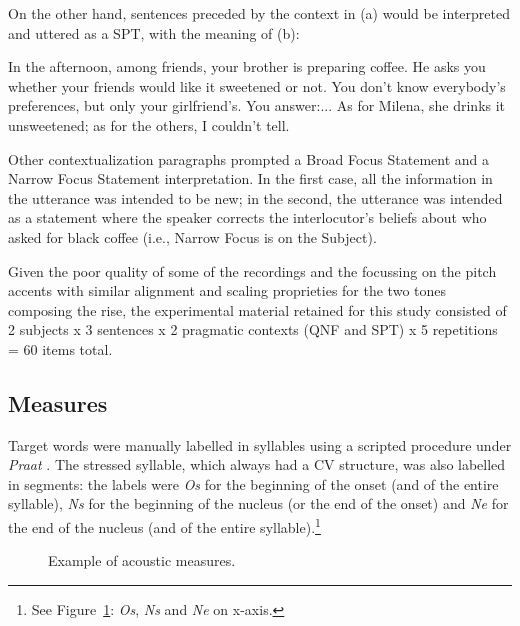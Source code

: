 On the other hand, sentences preceded by the context in (a) would be interpreted and uttered as a SPT, with the meaning of (b):

\eal
\ex In the afternoon, among friends, your brother is preparing coffee. He asks you whether your friends would like it sweetened or not. You don’t know everybody’s preferences, but only your girlfriend’s. You answer:...
\ex As for Milena, she drinks it unsweetened; as for the others, I couldn't tell.
\zl

Other contextualization paragraphs prompted a Broad Focus Statement and a Narrow Focus Statement interpretation. In the first case, all the information in the utterance was intended to be new; in the second, the utterance was intended as a statement where the speaker corrects the interlocutor's beliefs about who asked for black coffee (i.e., Narrow Focus is on the Subject).

Given the poor quality of some of the recordings and the focussing on the pitch accents with similar alignment and scaling proprieties for the two tones composing the rise, the experimental material retained for this study consisted of 2 subjects x 3 sentences x 2 pragmatic contexts (QNF and SPT) x 5 repetitions = 60 items total.

\subsection{Measures}\label{sec222}
Target words were manually labelled in syllables using a scripted procedure under \textit{Praat} \citep{boersma2008praat}. The stressed syllable, which always had a CV structure, was also labelled in segments: the labels were \textit{Os} for the beginning of the onset (and of the entire syllable), \textit{Ns} for the beginning of the nucleus (or the end of the onset) and \textit{Ne} for the end of the nucleus (and of the entire syllable).\footnote{See Figure~\ref{fig203}: \textit{Os}, \textit{Ns} and \textit{Ne} on x-axis.}

\begin{figure}
\centering
{}
\caption{Example of acoustic measures.}
\label{fig203}\end{figure}

